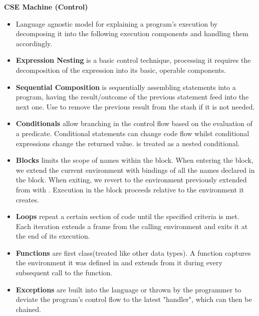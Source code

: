 \begin{center}
     \textbf{CSE Machine (Control)}
\end{center}
\begin{itemize}
    \item Language agnostic model for explaining a program's execution by decomposing it into the following execution components and handling them accordingly.
    \item \textbf{Expression Nesting} is a basic control technique, processing it requires the decomposition of the expression into its basic, operable components. 
    \item \textbf{Sequential Composition} is sequentially assembling statements into a program, having the result/outcome of the previous statement feed into the next one. Use  to remove the previous result from the stash if it is not needed.
    \item \textbf{Conditionals} allow branching in the control flow based on the evaluation of a predicate. Conditional statements can change code flow whilst conditional expressions change the returned value.  is treated as a nested conditional.
    \item \textbf{Blocks} limits the scope of names within the block. When entering the block, we extend the current environment with bindings of all the names declared in the block. When exiting, we revert to the environment previously extended from with . Execution in the block proceeds relative to the environment it creates.
    \item \textbf{Loops} repeat a certain section of code until the specified criteria is met. Each iteration extends a frame from the calling environment and exits it at the end of its execution.
    \item \textbf{Functions} are first class(treated like other data types). A function captures the environment it was defined in and extends from it during every subsequent call to the function.
    \item \textbf{Exceptions} are built into the language or thrown by the programmer to deviate the program's control flow to the latest "handler", which can then be chained.
\end{itemize}

\newpage

